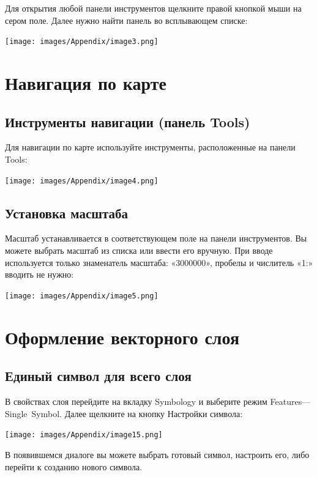 \documentclass[12pt,]{book}
\begin{document}
Для открытия любой панели инструментов щелкните правой кнопкой мыши на сером поле. Далее нужно найти панель во всплывающем списке:

\texttt{[image: images/Appendix/image3.png]}

\hypertarget{manual-navigation}{%
\chapter{Навигация по карте}\label{manual-navigation}}

\hypertarget{tools}{%
\section{Инструменты навигации (панель Tools)}\label{tools}}

Для навигации по карте используйте инструменты, расположенные на панели Tools:

\texttt{[image: images/Appendix/image4.png]}

\hypertarget{section-20}{%
\section{Установка масштаба}\label{section-20}}

Масштаб устанавливается в соответствующем поле на панели инструментов. Вы можете выбрать масштаб из списка или ввести его вручную. При вводе используется только знаменатель масштаба: «3000000», пробелы и числитель «1:» вводить не нужно:

\texttt{[image: images/Appendix/image5.png]}

\hypertarget{manual-vector}{%
\chapter{Оформление векторного слоя}\label{manual-vector}}

\hypertarget{manual-vector-one}{%
\section{Единый символ для всего слоя}\label{manual-vector-one}}

В свойствах слоя перейдите на вкладку Symbology и выберите режим Features---Single~Symbol. Далее щелкните на кнопку Настройки символа:

\texttt{[image: images/Appendix/image15.png]}

В появившемся диалоге вы можете выбрать готовый символ, настроить его, либо перейти к созданию нового символа.
\end{document}
